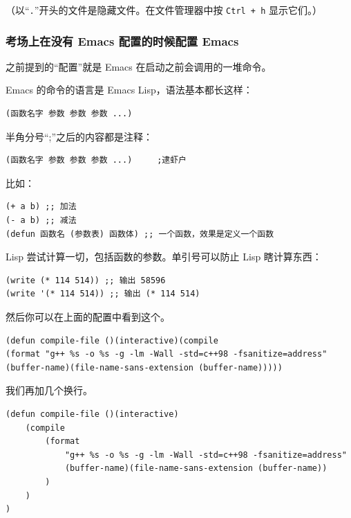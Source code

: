 \documentclass[UTF-8]{ctexart}
\begin{document}
				（以“\texttt{.}”开头的文件是隐藏文件。在文件管理器中按 \texttt{Ctrl + h} 显示它们。）
			
			\subsubsection{考场上在没有 Emacs 配置的时候配置 Emacs}
			
				之前提到的“配置”就是 Emacs 在启动之前会调用的一堆命令。
				
				Emacs 的命令的语言是 Emacs Lisp，语法基本都长这样：
				
				\begin{verbatim}
(函数名字 参数 参数 参数 ...)
				\end{verbatim}
			
				半角分号“;”之后的内容都是注释：
				
				\begin{verbatim}
(函数名字 参数 参数 参数 ...)     ;逮虾户
				\end{verbatim}
			
				比如：
				
				\begin{verbatim}
(+ a b) ;; 加法
(- a b) ;; 减法
(defun 函数名 (参数表) 函数体) ;; 一个函数，效果是定义一个函数
				\end{verbatim}
			
				Lisp 尝试计算一切，包括函数的参数。单引号可以防止 Lisp 瞎计算东西：
				
				\begin{verbatim}
(write (* 114 514)) ;; 输出 58596
(write '(* 114 514)) ;; 输出 (* 114 514)
				\end{verbatim}
				
				然后你可以在上面的配置中看到这个。
				
				\begin{verbatim}
(defun compile-file ()(interactive)(compile 
(format "g++ %s -o %s -g -lm -Wall -std=c++98 -fsanitize=address" 
(buffer-name)(file-name-sans-extension (buffer-name)))))
				\end{verbatim}
			
				我们再加几个换行。
				
				\begin{verbatim}
(defun compile-file ()(interactive)
    (compile 
        (format
            "g++ %s -o %s -g -lm -Wall -std=c++98 -fsanitize=address" 
            (buffer-name)(file-name-sans-extension (buffer-name))
        )
    )
)
				\end{verbatim}
			
\end{document}
